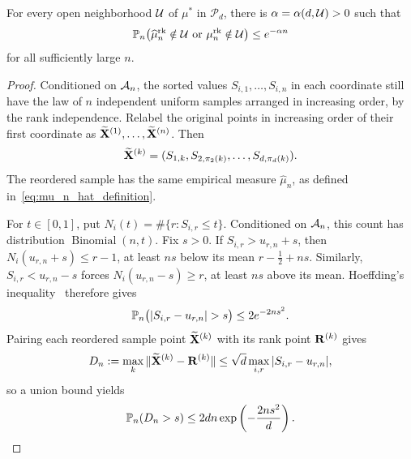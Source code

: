 \documentclass[11pt,letterpaper]{article}
\begin{document}
      \begin{theorem}\label{thm:permuton}\label{prop:permuton}\label{cor:permuton}
            For every open neighborhood $\cU$ of $\mu^\ast$ in $\mathcal P_d$, there is $\alpha=\alpha(d,\cU)>0$ such that
            \[
                  \P_n\bigl(\widehat\mu_n^{\mathrm{rk}}\notin\cU \text{ or }\mu_n^{\mathrm{rk}}\notin\cU\bigr) \le e^{-\alpha n}
            \]
            for all sufficiently large $n$.
      \end{theorem}
      \begin{proof}
            Conditioned on $\cA_n$, the sorted values $S_{i,1},\ldots,S_{i,n}$ in each coordinate still have the law of $n$ independent uniform samples arranged in increasing order, by the rank independence. Relabel the original points in increasing order of their first coordinate as $\widetilde{\vX}^{(1)},\ldots,\widetilde{\vX}^{(n)}$. Then
            \[
                  \widetilde\vX^{(k)}=(S_{1,k},S_{2,\pi_2(k)},\ldots,S_{d,\pi_d(k)}).
            \]
            The reordered sample has the same empirical measure $\widehat\mu_n$, as defined in~\eqref{eq:mu_n_hat_definition}.

            For $t\in[0,1]$, put $N_i(t)=\#\{r:S_{i,r}\le t\}$. Conditioned on $\cA_n$, this count has distribution $\operatorname{Binomial}(n,t)$. Fix $s>0$. If $S_{i,r}>u_{r,n}+s$, then $N_i(u_{r,n}+s)\le r-1$, at least $ns$ below its mean $r-\frac12+ns$. Similarly, $S_{i,r}<u_{r,n}-s$ forces $N_i(u_{r,n}-s)\ge r$, at least $ns$ above its mean. Hoeffding's inequality~\cite[Theorem~1]{Hoeffding1963} therefore gives
            \[
                  \P_n\bigl(|S_{i,r}-u_{r,n}|>s\bigr)\le2e^{-2ns^2}.
            \]
            Pairing each reordered sample point $\widetilde{\vX}^{(k)}$ with its rank point $\vR^{(k)}$ gives
            \[
                  D_n:=\max_k\|\widetilde\vX^{(k)}-\vR^{(k)}\|
                  \le\sqrt d\max_{i,r}|S_{i,r}-u_{r,n}|,
            \]
            so a union bound yields
            \begin{equation}\label{eq:rank-displacement}
                  \P_n(D_n>s)\le2dn\exp\left(-\frac{2ns^2}{d}\right).
            \end{equation}


\end{proof}
\end{document}
